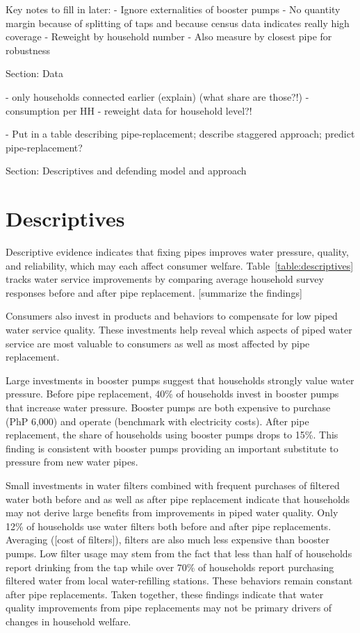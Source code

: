 \documentclass[12pt,table]{article}
\begin{document}
Key notes to fill in later:
- Ignore externalities of booster pumps
- No quantity margin because of splitting of taps and because census data indicates really high coverage
- Reweight by household number
- Also measure by closest pipe for robustness



Section: Data

	- only households connected earlier (explain) (what share are those?!)
	- consumption per HH
	- reweight data for household level?!

	- Put in a table describing pipe-replacement;  describe staggered approach; predict pipe-replacement?

Section: Descriptives and defending model and approach


\section{Descriptives}

Descriptive evidence indicates that fixing pipes improves water pressure, quality, and reliability, which may each affect consumer welfare.  Table~\ref{table:descriptives} tracks water service improvements by comparing average household survey responses before and after pipe replacement.   [summarize the findings]

Consumers also invest in products and behaviors to compensate for low piped water service quality.  These investments help reveal which aspects of piped water service are most valuable to consumers as well as most affected by pipe replacement.  

Large investments in booster pumps suggest that households strongly value water pressure.  Before pipe replacement, 40\% of households invest in booster pumps that increase water pressure.  Booster pumps are both expensive to purchase (PhP 6,000) and operate (benchmark with electricity costs).  After pipe replacement, the share of households using booster pumps drops to 15\%.  This finding is consistent with booster pumps providing an important substitute to pressure from new water pipes.

Small investments in water filters combined with frequent purchases of filtered water both before and as well as after pipe replacement indicate that households may not derive large benefits from improvements in piped water quality.  Only 12\% of households use water filters both before and after pipe replacements.  Averaging ([cost of filters]), filters are also much less expensive than booster pumps.  Low filter usage may stem from the fact that less than half of households report drinking from the tap while over 70\% of households report purchasing filtered water from local water-refilling stations.  These behaviors remain constant after pipe replacements.  Taken together, these findings indicate that water quality improvements from pipe replacements may not be primary drivers of changes in household welfare.
\end{document}
